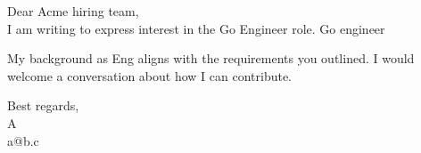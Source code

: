 \documentclass[11pt]{article}
\begin{document}
Dear Acme hiring team,\\

I am writing to express interest in the Go Engineer role. Go engineer

My background as Eng aligns with the requirements you outlined. I would welcome a conversation about how I can contribute.

Best regards,\\
A\\
a@b.c\\
\end{document}
